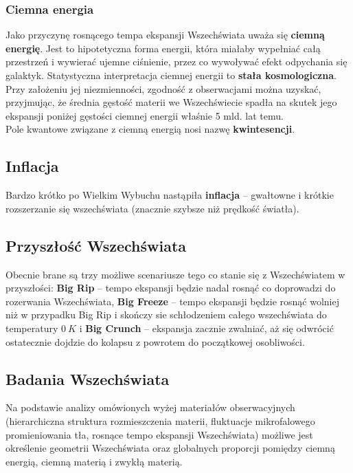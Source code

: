\documentclass[../index.tex]{subfiles}
\begin{document}
            \subsubsection{Ciemna energia}
                Jako przyczynę rosnącego tempa ekspansji Wszechświata uważa się \textbf{ciemną energię}. Jest to hipotetyczna forma energii, która miałaby wypełniać całą przestrzeń i wywierać ujemne ciśnienie, przez co wywoływać efekt odpychania się galaktyk. Statystyczna interpretacja ciemnej energii to \textbf{stała kosmologiczna}. Przy założeniu jej niezmienności, zgodność z obserwacjami można uzyskać, przyjmując, że średnia gęstość materii we Wszechświecie spadła na skutek jego ekspansji poniżej gęstości ciemnej energii właśnie 5 mld. lat temu.\\
                Pole kwantowe związane z ciemną energią nosi nazwę \textbf{kwintesencji}.
            \subsection{Inflacja}
                Bardzo krótko po Wielkim Wybuchu nastąpiła \textbf{inflacja} – gwałtowne i krótkie rozszerzanie się wszechświata (znacznie szybsze niż prędkość światła).
            \subsection{Przyszłość Wszechświata}
                Obecnie brane są trzy możliwe scenariusze tego co stanie się z Wszechświatem w przyszłości: \textbf{Big Rip} – tempo ekspansji będzie nadal rosnąć co doprowadzi do rozerwania Wszechświata, \textbf{Big Freeze} – tempo ekspansji będzie rosnąć wolniej niż w przypadku Big Rip i skończy sie schłodzeniem całego wszechświata do temperatury \(0\:K\) i \textbf{Big Crunch} – ekspansja zacznie zwalniać, aż się odwrócić ostatecznie dojdzie do kolapsu z powrotem do początkowej osobliwości.
        \subsection{Badania Wszechświata}
            Na podstawie analizy omówionych wyżej materiałów obserwacyjnych (hierarchiczna struktura rozmieszczenia materii, fluktuacje mikrofalowego promieniowania tła, rosnące tempo ekspansji Wszechświata) możliwe jest określenie geometrii Wszechświata oraz globalnych proporcji pomiędzy ciemną energią, ciemną materią i zwykłą materią.
\end{document}

